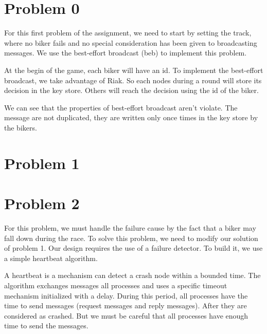 \documentclass{article}
\begin{document}
\section*{Problem 0}
For this first problem of the assignment, we need to start by setting the track, where no biker fails and no special
consideration has been given to broadcasting messages. We use the best-effort broadcast (beb) to implement 
this problem.\newline


At the begin of the game, each biker will have an id.  To implement the best-effort broadcast, we take advantage of
Riak. So each nodes during a round will store its decision in the key store. Others will reach the decision using the id of 
the biker.\newline

We can see that the properties of best-effort broadcast aren't violate. The message are not duplicated, they are written
only once times in the key store by the bikers.


\section*{Problem 1}

\section*{Problem 2}
For this problem, we must handle the failure cause by the fact that a biker may fall down during the race.
To solve this problem, we need to modify our solution of problem 1. Our design requires the use of a 
failure detector. To build it, we use a simple heartbeat algorithm.\newline

A heartbeat is a mechanism can detect a crash node within a bounded time. The algorithm exchanges 
messages all processes and uses a specific timeout mechanism initialized with a delay. During this period,
all processes have the time to send messages (request messages and reply messages). After they are considered 
as crashed. But we must be careful that all processes have enough time to send the messages. 
\end{document}
